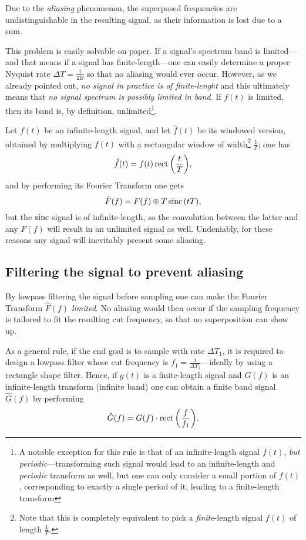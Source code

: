 \documentclass[\documentfontsize, twocolumn]{\classname}
\begin{document}
Due to the \emph{aliasing} phenomenon, the superposed frequencies are undistinguishable in the resulting signal, as their information is lost due to a sum.

This problem is easily solvable on paper. If a signal's spectrum band is limited---and that means if a signal has finite-length---one can easily determine a proper Nyquist rate $\Delta T = \frac {1}{2B}$ so that no aliasing would ever occur. However, as we already pointed out, \emph{no signal in practice is of finite-lenght} and this ultimately means that \emph{no signal spectrum is possibly limited in band}. If $f(t)$ is limited, then its band is, by definition, unlimited\footnote{A notable exception for this rule is that of an infinite-length signal $f(t)$, \emph{but periodic}---transforming such signal would lead to an infinite-length and \emph{periodic} transform as well, but one can only consider a small portion of $f(t)$, corresponding to exactly a single period of it, leading to a finite-length transform}.

Let $f(t)$ be an infinite-length signal, and let $\hat f(t)$ be its windowed version, obtained by multiplying $f(t)$ with a rectangular window of width\footnote{Note that this is completely equivalent to pick a \emph{finite}-length signal $f(t)$ of length $\frac 1 T$.} $\frac 1 T$; one has
\[
    \hat f(t) = f(t) \operatorname{rect}{\left(\frac t T\right)},
\]
and by performing its Fourier Transform one gets
\[
    \hat F(f) = F(f) \circledast T\operatorname{sinc}{\left(t T\right)},
\]
but the $\operatorname{sinc}$ signal is of infinite-length, so the convolution between the latter and any $F(f)$ will result in an unlimited signal as well. Undeniably, for these reasons any signal will inevitably present some aliasing.

\subsection{Filtering the signal to prevent aliasing}

By lowpass filtering the signal before sampling one can make the Fourier Transform $\hat F(f)$ \emph{limited}. No aliasing would then occur if the sampling frequency is tailored to fit the resulting cut frequency, so that no superposition can show up.

As a general rule, if the end goal is to sample with rate $\Delta T_1$, it is required to design a lowpass filter whose cut frequency is $f_1 = \frac 1 {\Delta T_1}$---ideally by using a rectangle shape filter. Hence, if $g(t)$ is a finite-length signal and $G(f)$ is an infinite-length transform (infinite band) one can obtain a finite band signal $\hat G(f)$ by performing
\[
    \hat G(f) = G(f)\cdot \operatorname{rect}{\left(\frac f {f_1}\right)}.
\]
\end{document}
